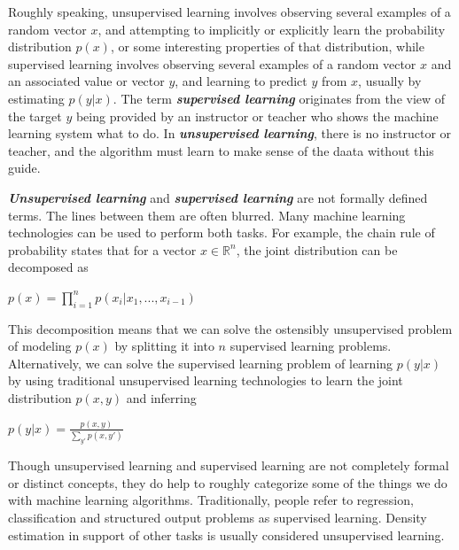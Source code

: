 \documentclass{report}
\begin{document}
\noindent Roughly speaking, unsupervised learning involves observing several examples of a random vector $x$, and attempting to implicitly or explicitly learn the probability distribution $p(x)$, or some interesting properties of that distribution, while supervised learning involves observing several examples of a random vector $x$ and an associated value or vector $y$, and learning to predict $y$ from $x$, usually by estimating $p(y|x)$. The term \textbf{\textit{supervised learning}} originates from the view of the target $y$ being provided by an instructor or teacher who shows the machine learning system what to do. In \textbf{\textit{unsupervised learning}}, there is no instructor or teacher, and the algorithm must learn to make sense of the daata without this guide.\newline

\textbf{\textit{Unsupervised learning}} and \textbf{\textit{supervised learning}} are not formally defined terms. The lines between them are often blurred. Many machine learning technologies can be used to perform both tasks. For example, the chain rule of probability states that for a vector $x \in \mathbb{R}^n$, the joint distribution can be decomposed as\newline\newline
\centerline{$p(x) = \prod_{i=1}^{n} p(x_i | x_1, ..., x_{i-1})$}\newline\newline

This decomposition means that we can solve the ostensibly unsupervised problem of modeling $p(x)$ by splitting it into $n$ supervised learning problems. Alternatively, we can solve the supervised learning problem of learning $p(y|x)$ by using traditional unsupervised learning technologies to learn the joint distribution $p(x,y)$ and inferring\newline\newline
\centerline{$p(y|x)=\frac{p(x,y)}{\sum_{y'}p(x,y')}$}\newline

\noindent Though unsupervised learning and supervised learning are not completely formal or distinct concepts, they do help to roughly categorize some of the things we do with machine learning algorithms. Traditionally, people refer to regression, classification and structured output problems as supervised learning. Density estimation in support of other tasks is usually considered unsupervised learning.\newline
\end{document}
